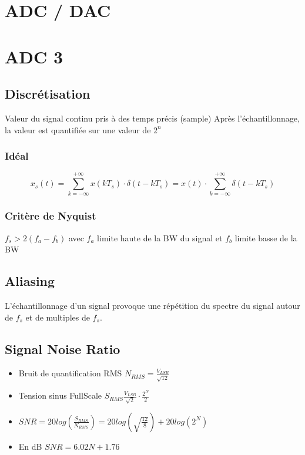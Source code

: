 \documentclass[resume]{subfiles}
\begin{document}
\section{ADC / DAC}

\section{ADC 3}

\subsection{Discrétisation}
Valeur du signal continu pris à des temps précis (sample)
Après l'échantillonnage, la valeur est quantifiée sur une valeur de $2^n$
\subsubsection{Idéal}
\begin{equation}
x_s(t) = \sum^{+\infty}_{k=-\infty} x(kT_s)\cdot \delta(t-kT_s) = x(t)\cdot \sum^{+\infty}_{k=-\infty} \delta(t-kT_s)
\end{equation}
\subsubsection{Critère de Nyquist}
$f_s > 2(f_a-f_b)$ avec $f_a$ limite haute de la BW du signal et $f_b$ limite basse de la BW

\subsection{Aliasing}
L'échantillonnage d'un signal provoque une répétition du spectre du signal autour de $f_s$ et de multiples de $f_s$.

\subsection{Signal Noise Ratio}
\begin{itemize}
\item Bruit de quantification RMS $N_{RMS} = \frac{V_{LSB}}{\sqrt{12}}$
\item Tension sinus FullScale $S_{RMS}\frac{V_{LSB}}{\sqrt{2}}\cdot \frac{2^N}{2}$
\item $SNR = 20log(\frac{S_{RMS}}{N_{RMS}}) = 20log(\sqrt{\frac{12}{8}}) + 20log(2^N)$
\item En dB $SNR = 6.02N + 1.76 $
\end{itemize}
\end{document}
